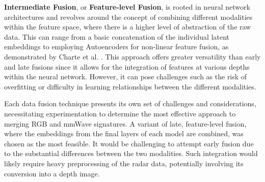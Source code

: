 \documentclass{mpaper}
\begin{document}
\textbf{Intermediate Fusion}, or \textbf{Feature-level Fusion}, is rooted in neural network architectures and revolves around the concept of combining different modalities within the feature space, where there is a higher level of abstraction of the raw data. This can range from a basic concatenation of the individual latent embeddings to employing Autoencoders for non-linear feature fusion, as demonstrated by Charte et al. \cite{charte2018practical}. This approach offers greater versatility than early and late fusions since it allows for the integration of features at various depths within the neural network. However, it can pose challenges such as the risk of overfitting or difficulty in learning relationships between the different modalities.

Each data fusion technique presents its own set of challenges and considerations, necessitating experimentation to determine the most effective approach to merging RGB and mmWave signatures. A variant of late, feature-level fusion, where the embeddings from the final layers of each model are combined, was chosen as the most feasible. It would be challenging to attempt early fusion due to the substantial differences between the two modalities. Such integration would likely require heavy preprocessing of the radar data, potentially involving its conversion into a depth image.
\end{document}
